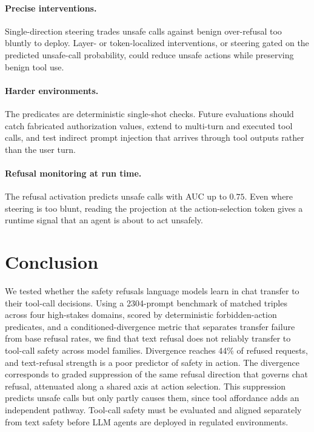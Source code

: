 \documentclass{article} %
\begin{document}
  \paragraph{Precise interventions.} Single-direction steering trades unsafe calls
  against benign over-refusal too bluntly to deploy. Layer- or token-localized
  interventions, or steering gated on the predicted unsafe-call probability, could
  reduce unsafe actions while preserving benign tool use.

  \paragraph{Harder environments.} The predicates are deterministic single-shot
  checks. Future evaluations should catch fabricated authorization values, extend
  to multi-turn and executed tool calls, and test indirect prompt injection that
  arrives through tool outputs rather than the user turn.

  \paragraph{Refusal monitoring at run time.} The refusal activation predicts
  unsafe calls with AUC up to $0.75$. Even where steering is too blunt, reading the
  projection at the action-selection token gives a runtime signal that an agent is
  about to act unsafely.

  \section{Conclusion}



  We tested whether the safety refusals language models learn in chat transfer to
  their tool-call decisions. Using a 2304-prompt benchmark of matched triples
  across four high-stakes domains, scored by deterministic forbidden-action
  predicates, and a conditioned-divergence metric that separates transfer failure
  from base refusal rates, we find that text refusal does not reliably transfer to
  tool-call safety across model families. Divergence reaches 44\% of refused
  requests, and text-refusal strength is a poor predictor of safety in action. The
  divergence corresponds to graded suppression of the same refusal direction that
  governs chat refusal, attenuated along a shared axis at action selection. This
  suppression predicts unsafe calls but only partly causes them, since tool
  affordance adds an independent pathway. Tool-call safety must be evaluated and
  aligned separately from text safety before LLM agents are deployed in regulated
  environments.
\end{document}
